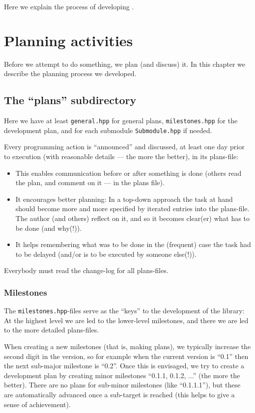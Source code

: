 \documentclass{book}
\begin{document}
Here we explain the process of developing \OKplatform.


\chapter{Planning activities}
\label{cha:Planningactivities}

Before we attempt to do something, we plan (and discuss) it. In this chapter we describe the planning process we developed.


\section{The ``plans'' subdirectory}
\label{sec:planssubdirectory}

Here we have at least \texttt{general.hpp} for general plans, \texttt{milestones.hpp} for the development plan, and for each submodule \texttt{Submodule.hpp} if needed.

Every programming action is ``announced'' and discussed, at least one day prior to execution (with reasonable details --- the more the better), in its plans-file:
\begin{itemize}
\item This enables communication before or after something is done (others read the plan, and comment on it --- in the plans file).
\item It encourages better planning: In a top-down approach the task at hand should become more and more specified by iterated entries into the plans-file. The author (and others) reflect on it, and so it becomes clear(er) what has to be done (and why(!)).
\item It helps remembering what was to be done in the (frequent) case the task had to be delayed (and/or is to be executed by someone else(!)).
\end{itemize}

Everybody must read the change-log for all plans-files.


\subsection{Milestones}
\label{sec:Milestones}

The \texttt{milestones.hpp}-files serve as the ``keys'' to the development of the library: At the highest level we are led to the lower-level milestones, and there we are led to the more detailed plans-files.

When creating a new milestones (that is, making plans), we typically increase the second digit in the version, so for example when the current version is ``0.1'' then the next sub-major milestone is ``0.2''. Once this is envisaged, we try to create a development plan by creating minor milestones ``0.1.1, 0.1.2, ...'' (the more the better). There are no plans for sub-minor milestones (like ``0.1.1.1''), but these are automatically advanced once a sub-target is reached (this helps to give a sense of achievement).
\end{document}
